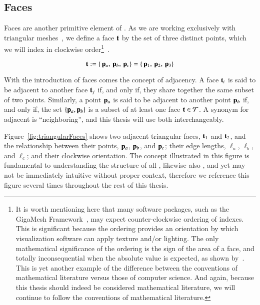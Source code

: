 %
%
%
%
\subsection{Faces}
\label{ch2sTDDssF}
Faces are another primitive element of \tdd{}. As we are working exclusively with triangular meshes~\cite[p.~26]{Mara12}, we define a face $\mathbf{t}$ by the set of three distinct points, which we will index in clockwise order\footnote{It is worth mentioning here that many software packages, such as the GigaMesh Framework~\cite[p.~89]{Mara12}, may expect counter-clockwise ordering of indexes. This is significant because the ordering provides an orientation by which visualization software can apply texture and/or lighting. The only mathematical significance of the ordering is the sign of the area of a face, and totally inconsequential when the absolute value is expected, as shown by~\cite[p.~2]{Braden86}. This is yet another example of the difference between the conventions of mathematical literature versus those of computer science. And again, because this thesis should indeed be considered mathematical literature, we will continue to follow the conventions of mathematical literature.}~\cite[p.~4]{Mara17}.

\begin{equation}
	\mathbf{t} := \left \{\,\mathbf{p}_a,\,\mathbf{p}_b,\,\mathbf{p}_c\right \} = \left \{\,\mathbf{p}_1,\,\mathbf{p}_2,\,\mathbf{p}_3\right \}
	\label{eq:defineFaces}
\end{equation}

With the introduction of faces comes the concept of adjacency. A face $\mathbf{t}_i$ is said to be \gls{adjacent} to another face $\mathbf{t}_j$ if, and only if, they share together the same subset of two points. Similarly, a point $\mathbf{p}_a$ is said to be adjacent to another point $\mathbf{p}_b$ if, and only if, the set $\{\mathbf{p}_a, \mathbf{p}_b\}$ is a subset of at least one face $\mathbf{t} \in \mathcal{T}$. A synonym for adjacent is ``\gls{neighboring}'', and this thesis will use both interchangeably.

Figure~\ref{fig:triangularFaces} shows two adjacent triangular faces, $\mathbf{t}_1$ and $\mathbf{t}_2$, and the relationship between their points, $\mathbf{p}_a$, $\mathbf{p}_b$, and $\mathbf{p}_c$; their edge lengths, $\ell_a$, $\ell_b$, and $\ell_c$; and their clockwise orientation. The concept illustrated in this figure is fundamental to understanding the structure of all \tdd{}, likewise also , and yet may not be immediately intuitive without proper context, therefore we reference this figure several times throughout the rest of this thesis.

